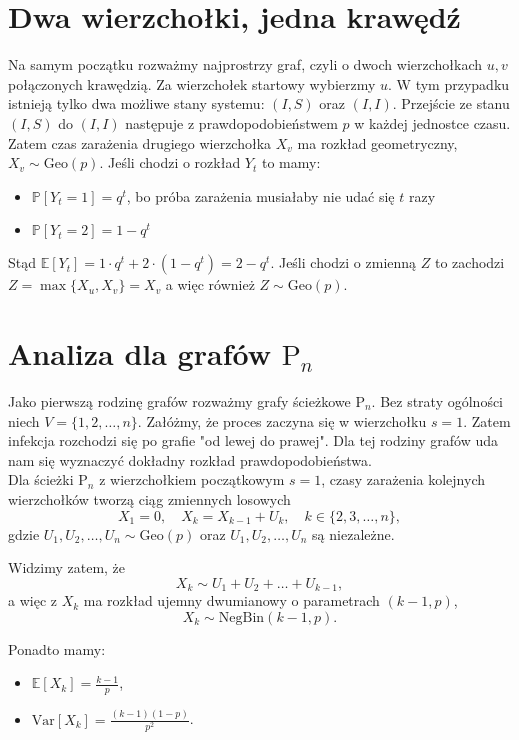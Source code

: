 \section{Dwa wierzchołki, jedna krawędź}

Na samym początku rozważmy najprostrzy graf, czyli o dwoch wierzchołkach $u,v$ połączonych krawędzią. Za wierzchołek startowy wybierzmy $u$. W tym przypadku istnieją tylko dwa możliwe stany systemu: $(I,S)$ oraz $(I,I)$. Przejście ze stanu $(I, S)$ do $(I, I)$ następuje z prawdopodobieństwem $p$ w każdej jednostce czasu. Zatem czas zarażenia drugiego wierzchołka $X_v$ ma rozkład geometryczny, $X_v \sim \mathrm{Geo}(p)$. Jeśli chodzi o rozkład $Y_t$ to mamy:
\begin{itemize}
    \item $\mathbb{P}[Y_t=1]=q^t$, bo próba zarażenia musiałaby nie udać się $t$ razy
    \item $\mathbb{P}[Y_t=2]=1-q^t$
\end{itemize}
Stąd $\mathbb{E}[Y_t]=1\cdot q^t + 2 \cdot (1-q^t) = 2-q^t$. Jeśli chodzi o zmienną $Z$ to zachodzi $Z=\max\{X_u,X_v\}=X_v$ a więc również $Z\sim \mathrm{Geo}(p)$.

\section{Analiza dla grafów $\mathrm{P}_n$}

Jako pierwszą rodzinę grafów rozważmy grafy ścieżkowe $\mathrm{P}_n$. Bez straty ogólności niech $V=\{1,2,\dots,n\}$. Załóżmy, że proces zaczyna się w wierzchołku $s=1$. Zatem infekcja rozchodzi się po grafie "od lewej do prawej". Dla tej rodziny grafów uda nam się wyznaczyć dokładny rozkład prawdopodobieństwa. \\
Dla ścieżki $\mathrm{P}_n$ z wierzchołkiem początkowym $s=1$,  
czasy zarażenia kolejnych wierzchołków tworzą ciąg zmiennych losowych
\[
X_1 = 0, \quad X_{k} = X_{k-1} + U_k, \quad k\in\{2,3,\dots,n\},
\]
gdzie $U_1,U_2,\dots,U_n \sim \mathrm{Geo}(p)$ oraz $U_1,U_2,\dots,U_n$ są niezależne. 

Widzimy zatem, że
\[
X_k \sim U_1 + U_2 + \dots + U_{k-1},
\]
a więc z  $X_k$ ma rozkład ujemny dwumianowy o parametrach $(k-1, p)$, 
\[
X_k\sim \mathrm{NegBin}(k-1, p).
\]

Ponadto mamy:
\begin{itemize}
    \item $\mathbb{E}[X_k] = \frac{k-1}{p}$,
    \item $\mathrm{Var}[X_k] = \frac{(k-1)(1-p)}{p^2}$.
\end{itemize}

